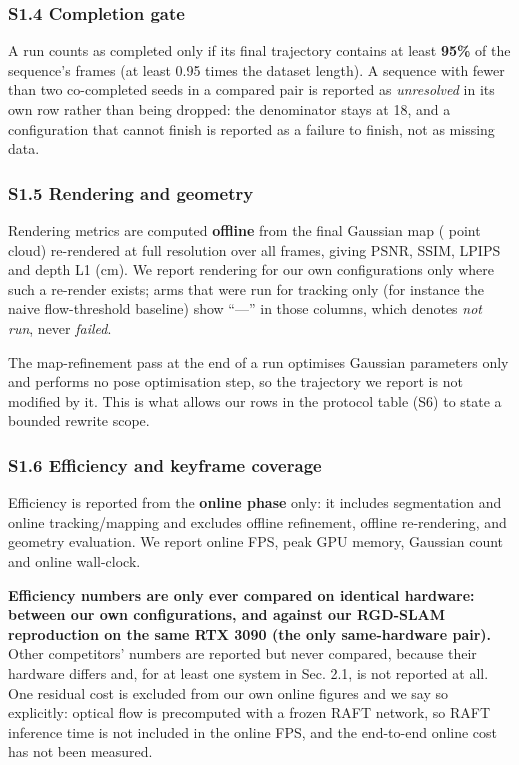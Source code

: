 \subsubsection{S1.4 Completion gate}


A run counts as completed only if its final trajectory contains at least \textbf{95\%} of the sequence's frames (at least 0.95 times the dataset length). A sequence with fewer than two co-completed seeds in a compared pair is reported as \emph{unresolved} in its own row rather than being dropped: the denominator stays at 18, and a configuration that cannot finish is reported as a failure to finish, not as missing data.


\subsubsection{S1.5 Rendering and geometry}


Rendering metrics are computed \textbf{offline} from the final Gaussian map ( point cloud) re-rendered at full resolution over all frames, giving PSNR, SSIM, LPIPS and depth L1 (cm). We report rendering for our own configurations only where such a re-render exists; arms that were run for tracking only (for instance the naive flow-threshold baseline) show ``---'' in those columns, which denotes \emph{not run}, never \emph{failed}.


The map-refinement pass at the end of a run optimises Gaussian parameters only and performs no pose optimisation step, so the trajectory we report is not modified by it. This is what allows our rows in the protocol table (S6) to state a bounded rewrite scope.


\subsubsection{S1.6 Efficiency and keyframe coverage}


Efficiency is reported from the \textbf{online phase} only: it includes segmentation and online tracking/mapping and excludes offline refinement, offline re-rendering, and geometry evaluation. We report online FPS, peak GPU memory, Gaussian count and online wall-clock.


\textbf{Efficiency numbers are only ever compared on identical hardware: between our own configurations, and against our RGD-SLAM reproduction on the same RTX 3090 (the only same-hardware pair).} Other competitors' numbers are reported but never compared, because their hardware differs and, for at least one system in Sec. 2.1, is not reported at all. One residual cost is excluded from our own online figures and we say so explicitly: optical flow is precomputed with a frozen RAFT network, so RAFT inference time is not included in the online FPS, and the end-to-end online cost has not been measured.


